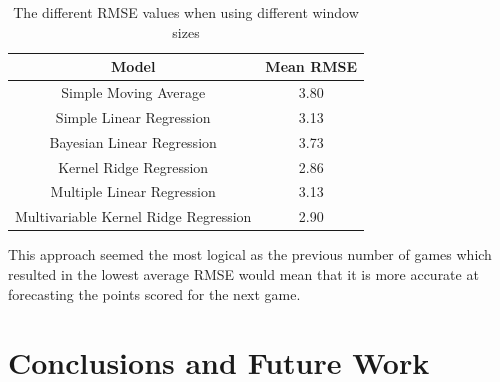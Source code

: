\documentclass[a4paper,11pt,twoside]{article}
\begin{document}
\vspace{5mm}
\begin{table}[h!]
\captionsetup{justification=centering}
\begin{center}
\begin{tabular}{ |c|c|} 
 \hline
     \textbf{Model} & \textbf{Mean RMSE}\\ 
 \hline
 Simple Moving Average  & 3.80\\ 
 \hline
 Simple Linear Regression & 3.13\\ 
 \hline
 Bayesian Linear Regression  & 3.73 \\
 \hline
 Kernel Ridge Regression  & 2.86\\
 \hline
 Multiple Linear Regression& 3.13\\
 \hline
 Multivariable Kernel Ridge Regression  & 2.90\\
 \hline
\end{tabular}
\end{center}
\caption{The different RMSE values when using different window sizes}
\end{table}
\vspace{5mm}

This approach seemed the most logical as the previous number of games which resulted in the lowest average RMSE would mean that it is more accurate at forecasting the points scored for the next game.

\newpage
\section{Conclusions and Future Work}
\end{document}
